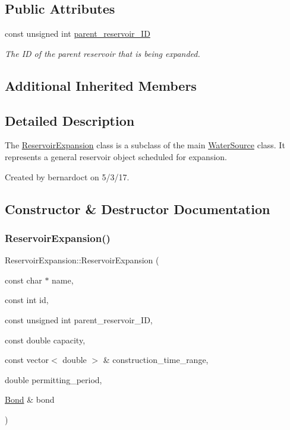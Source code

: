 \subsection*{Public Attributes}
\begin{DoxyCompactItemize}
\item 
const unsigned int \mbox{\hyperlink{classReservoirExpansion_a56527196174404cfed20b863df2ab0ba}{parent\+\_\+reservoir\+\_\+\+ID}}
\begin{DoxyCompactList}\small\item\em The ID of the parent reservoir that is being expanded. \end{DoxyCompactList}\end{DoxyCompactItemize}
\subsection*{Additional Inherited Members}


\subsection{Detailed Description}
The {\ttfamily \mbox{\hyperlink{classReservoirExpansion}{Reservoir\+Expansion}}} class is a subclass of the main {\ttfamily \mbox{\hyperlink{classWaterSource}{Water\+Source}}} class. It represents a general reservoir object scheduled for expansion. 

Created by bernardoct on 5/3/17. 

\subsection{Constructor \& Destructor Documentation}
\mbox{\label{classReservoirExpansion_aa742cae4276e97847681dac4f828b5ae}} 
\subsubsection{\texorpdfstring{Reservoir\+Expansion()}{ReservoirExpansion()}\hspace{0.1cm}{\footnotesize\ttfamily [1/2]}}
{\footnotesize\ttfamily Reservoir\+Expansion\+::\+Reservoir\+Expansion (\begin{DoxyParamCaption}\item[{const char $\ast$}]{name,  }\item[{const int}]{id,  }\item[{const unsigned int}]{parent\+\_\+reservoir\+\_\+\+ID,  }\item[{const double}]{capacity,  }\item[{const vector$<$ double $>$ \&}]{construction\+\_\+time\+\_\+range,  }\item[{double}]{permitting\+\_\+period,  }\item[{\mbox{\hyperlink{classBond}{Bond}} \&}]{bond }\end{DoxyParamCaption})}




